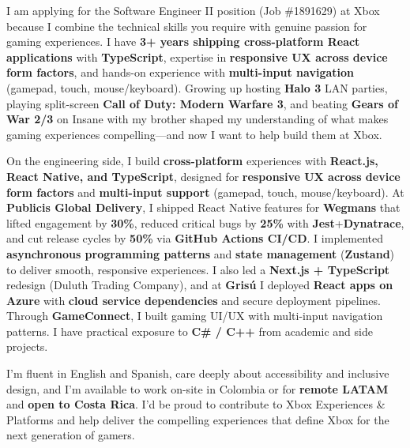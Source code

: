 \documentclass[11pt, a4paper]{awesome-cv}
\begin{document}
\makecvheader[R]
\makelettertitle

\begin{cvletter}

I am applying for the Software Engineer II position (Job \#1891629) at Xbox because I combine the technical skills you require with genuine passion for gaming experiences. I have \textbf{3+ years shipping cross-platform React applications} with \textbf{TypeScript}, expertise in \textbf{responsive UX across device form factors}, and hands-on experience with \textbf{multi-input navigation} (gamepad, touch, mouse/keyboard). Growing up hosting \textbf{Halo 3} LAN parties, playing split-screen \textbf{Call of Duty: Modern Warfare 3}, and beating \textbf{Gears of War 2/3} on Insane with my brother shaped my understanding of what makes gaming experiences compelling—and now I want to help build them at Xbox.

On the engineering side, I build \textbf{cross-platform} experiences with \textbf{React.js, React Native, and TypeScript}, designed for \textbf{responsive UX across device form factors} and \textbf{multi-input support} (gamepad, touch, mouse/keyboard). At \textbf{Publicis Global Delivery}, I shipped React Native features for \textbf{Wegmans} that lifted engagement by \textbf{30\%}, reduced critical bugs by \textbf{25\%} with \textbf{Jest}+\textbf{Dynatrace}, and cut release cycles by \textbf{50\%} via \textbf{GitHub Actions CI/CD}. I implemented \textbf{asynchronous programming patterns} and \textbf{state management} (\textbf{Zustand}) to deliver smooth, responsive experiences. I also led a \textbf{Next.js + TypeScript} redesign (Duluth Trading Company), and at \textbf{Grisú} I deployed \textbf{React apps on Azure} with \textbf{cloud service dependencies} and secure deployment pipelines. Through \textbf{GameConnect}, I built gaming UI/UX with multi-input navigation patterns. I have practical exposure to \textbf{C\# / C++} from academic and side projects.

I'm fluent in English and Spanish, care deeply about accessibility and inclusive design, and I'm available to work on-site in Colombia or for \textbf{remote LATAM} and \textbf{open to Costa Rica}. I'd be proud to contribute to Xbox Experiences \& Platforms and help deliver the compelling experiences that define Xbox for the next generation of gamers.

\end{cvletter}

\makeletterclosing
\end{document}
